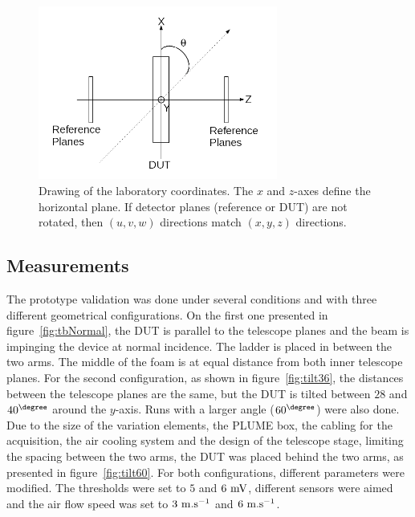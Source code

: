     \begin{figure}[!h]
      \centering
      \includegraphics[width = 0.7\textwidth]{Pictures/deformation/lab_frame.png}
      \caption{Drawing of the laboratory coordinates. The $x$ and $z$-axes define the horizontal plane. If detector planes (reference or DUT) are not rotated, then $(u,v,w)$ directions match $(x,y,z)$ directions.}
      \label{fig:labCoordinates}
    \end{figure}

    \subsection{Measurements}

    The prototype validation was done under several conditions and with three different geometrical configurations.
    On the first one presented in figure~\ref{fig:tbNormal}, the \gls{DUT} is parallel to the telescope planes and the beam is impinging the device at normal incidence.
    The ladder is placed in between the two arms.
    The middle of the foam is at equal distance from both inner telescope planes.
    For the second configuration, as shown in figure~\ref{fig:tilt36}, the distances between the telescope planes are the same, but the \gls{DUT} is tilted between $28$ and $40^{\degree}$ around the $y$-axis.
    Runs with a larger angle ($60^{\degree}$) were also done.
    Due to the size of the variation elements, the \gls{PLUME} box, the cabling for the acquisition, the air cooling system and the design of the telescope stage, limiting the spacing between the two arms, the \gls{DUT} was placed behind the two arms, as presented in figure~\ref{fig:tilt60}.
    For both configurations, different parameters were modified.
    The thresholds were set to $5$ and $6~\rm{mV}$, different sensors were aimed and the air flow speed was set to $3~\rm{m.s}^{-1}$ and $6~\rm{m.s}^{-1}$.


